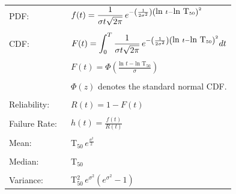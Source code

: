 \documentclass[12pt]{article}
\begin{document}
\pagestyle{empty}
\Large
{}
\pagecolor{ehandbook}

\bf
\boldmath

\hspace*{-.5in}
\begin{tabular}{ll}
PDF:                 & $\displaystyle{f(t) = \frac{1}{\sigma t \sqrt{2 \pi}} \, e^{- \left( \frac{1}{2 \sigma^2} \right) \left( \mbox{\normalsize ln } t - \mbox{\normalsize ln T}_{50}\right)^2 }}$ \\
                       & \\
CDF:                 & $\displaystyle{F(t) = \int_{0}^{T} \frac{1}{\sigma t \sqrt{2 \pi}} \, e^{- \left( \frac{1}{2 \sigma^2} \right) \left( \mbox{\normalsize ln } t - \mbox{\normalsize ln T}_{50}\right)^2} dt} $ \\
                     & \\
                     & $\displaystyle{F(t) = \Phi \left( \frac{\mbox{ln }t - \mbox{ln T}_{50}}{\sigma}\right)}$ \\
                     & \\
                     & $\Phi(z)$ denotes the standard normal CDF.\\
                     & \\
Reliability:         & $ R(t) = 1-F(t) $ \\
                     & \\
Failure Rate: \,\,   & $\displaystyle{h(t) =  \frac{f(t)}{R(t)}}$ \\
                     & \\
Mean:                & T$\displaystyle{_{50} \, e^{\frac{\sigma^2}{2}}}$ \\
                     & \\
Median:             & T$\displaystyle{_{50}}$ \\
                       & \\
Variance:            & T$\displaystyle{_{50}^2 \, e^{\sigma^2} \left(e^{\sigma^2} -1 \right) }$ 
\end{tabular}
 
    
\end{document}
